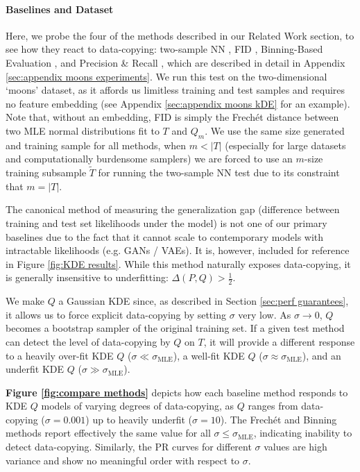 \paragraph{Baselines and Dataset} Here, we probe the four of the methods described in our Related Work section, to see how they react to data-copying: two-sample NN \citep{lopez}, FID \citep{heusel}, Binning-Based Evaluation \citep{richardson}, and Precision \& Recall \citep{mehdi}, which are described in detail in Appendix \ref{sec:appendix moons experiments}. We run this test on the two-dimensional `moons' dataset, as it affords us limitless training and test samples and requires no feature embedding (see Appendix \ref{sec:appendix moons kDE} for an example). Note that, without an embedding, FID is simply the Frech\'et distance between two MLE normal distributions fit to $T$ and $Q_m$. We use the same size generated and training sample for all methods, when $m < |T|$ (especially for large datasets and computationally burdensome samplers) we are forced to use an $m$-size training subsample $\widetilde{T}$ for running the two-sample NN test due to its constraint that $m = |T|$.  

The canonical method of measuring the generalization gap (difference between training and test set likelihoods under the model) is not one of our primary baselines due to the fact that it cannot scale to contemporary models with intractable likelihoods (e.g. GANs / VAEs). It is, however, included for reference in Figure \ref{fig:KDE results}. While this method naturally exposes data-copying, it is generally insensitive to underfitting: $\Delta(P,Q) > \frac{1}{2}$. 

We make $Q$ a Gaussian KDE since, as described in Section \ref{sec:perf guarantees}, it allows us to force explicit data-copying by setting $\sigma$ very low. As $\sigma \rightarrow 0$, $Q$ becomes a bootstrap sampler of the original training set. If a given test method can detect the level of data-copying by $Q$ on $T$, it will provide a different response to a heavily over-fit KDE $Q$ ($\sigma \ll \sigma_{\text{MLE}}$), a well-fit KDE $Q$ ($\sigma \approx \sigma_{\text{MLE}}$), and an underfit KDE $Q$ ($\sigma \gg \sigma_{\text{MLE}}$). 

\textbf{Figure \ref{fig:compare methods}} depicts how each baseline method responds to KDE $Q$ models of varying degrees of data-copying, as $Q$ ranges from data-copying ($\sigma = 0.001$) up to heavily underfit ($\sigma = 10$). The Frech\'et and Binning methods report effectively the same value for all $\sigma \leq \sigma_{\text{MLE}}$, indicating inability to detect data-copying. Similarly, the PR curves for different $\sigma$ values are high variance and show no meaningful order with respect to $\sigma$. 


